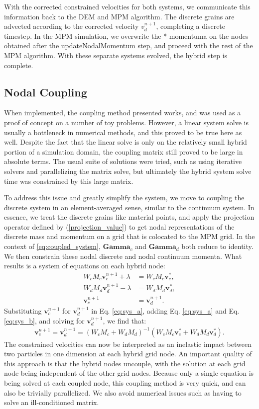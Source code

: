 With the corrected constrained velocities for both systems, we communicate this information back to the DEM and MPM algorithm. The discrete grains are advected according to the corrected velocity $v^{n+1}_d$, completing a discrete timestep. In the MPM simulation, we overwrite the * momentuma on the nodes obtained after the updateNodalMomentum step, and proceed with the rest of the MPM algorithm. With these separate systems evolved, the hybrid step is complete.

\subsection{Nodal Coupling}
When implemented, the coupling method presented works, and was used as a proof of concept on a number of toy problems. However, a linear system solve is usually a bottleneck in numerical methods, and this proved to be true here as well. Despite the fact that the linear solve is only on the relatively small hybrid portion of a simulation domain, the coupling matrix still proved to be large in absolute terms. The usual suite of solutions were tried, such as using iterative solvers and parallelizing the matrix solve, but ultimately the hybrid system solve time was constrained by this large matrix.

To address this issue and greatly simplify the system, we move to coupling the discrete system in an element-averaged sense, similar to the continuum system. In essence, we treat the discrete grains like material points, and apply the projection operator defined by (\ref{projection_value}) to get nodal representations of the discrete mass and momentum on a grid that is colocated to the MPM grid. In the context of \ref{eq:coupled_system}, $\bm{Gamma}_c$ and $\bm{Gamma}_d$ both reduce to identity. We then constrain these nodal discrete and nodal continuum momenta. What results is a system of equations on each hybrid node:
\begin{align}
W_c M_c \bm{v}_c^{n+1} + \lambda &= W_c M_c \bm{v}^*_c , \label{eq:sys_a} \\
W_d M_d \bm{v}_d^{n+1} - \lambda &= W_d M_d \bm{v}^*_d , \label{eq:sys_b} \\
\bm{v}_c^{n+1} &= \bm{v}_d^{n+1} . \label{eq:sys_c}
\end{align}
Substituting $\bm{v}_c^{n+1}$ for $\bm{v}_d^{n+1}$ in Eq. \eqref{eq:sys_a}, adding Eq. \eqref{eq:sys_a} and Eq. \eqref{eq:sys_b},
and solving for $\bm{v}_d^{n+1}$, we find that:
\begin{align}
\label{eq:inexpensive_coupling}
\bm{v}_c^{n+1} = \bm{v}_d^{n+1} = \left( W_c M_c + W_d M_d \right)^{-1} \left( W_c M_c \bm{v}_c^* + W_d M_d \bm{v}_d^* \right) .
\end{align}
The constrained velocities can now be interpreted as an
inelastic impact between two particles in one dimension at each hybrid grid node. An important quality of this approach is that the hybrid nodes uncouple, with the solution at each grid node being independent of the other grid nodes. Because only a single equation is being solved at each coupled node, this coupling method is very quick, and can also be trivially parallelized. We also avoid numerical issues such as having to solve an ill-conditioned matrix.

